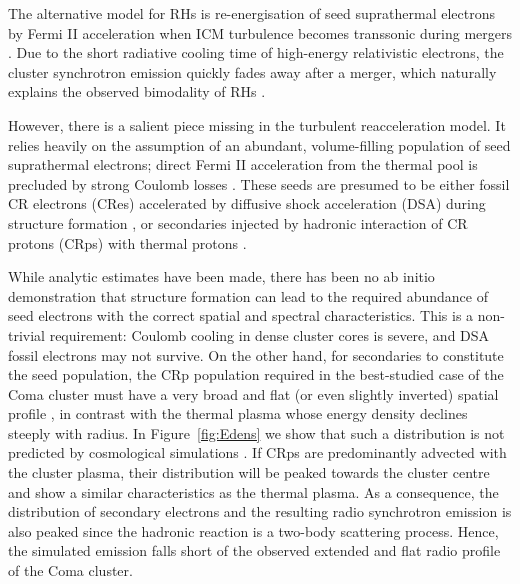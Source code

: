 \documentclass[fleqn,usenatbib,useAMS]{mnras}
\begin{document}
The alternative model for RHs is re-energisation of seed suprathermal
electrons by Fermi II acceleration when ICM turbulence becomes
transsonic during mergers
\citep{1987A&A...182...21S,1993ApJ...406..399G,2001MNRAS.320..365B,
  2004MNRAS.350.1174B,brunetti07,brunetti11,miniati15}. Due
to the short radiative cooling time of high-energy relativistic
electrons, the cluster synchrotron emission quickly fades away after a
merger, which naturally explains the observed bimodality of RHs
\cite[see e.g.][]{2013MNRAS.429.3564D,2014MNRAS.443.3564D}.

However, there is a salient piece missing in the turbulent
reacceleration model. It relies heavily on the assumption of an
abundant, volume-filling population of seed suprathermal electrons;
direct Fermi II acceleration from the thermal pool is precluded by
strong Coulomb losses
\citep{2008ApJ...682..175P,2012ApJ...759..113C}. These seeds are
presumed to be either fossil CR electrons (CRes) accelerated by
diffusive shock acceleration (DSA) during structure formation
\citep{1999ApJ...520..529S}, or secondaries injected by hadronic
interaction of CR protons (CRps) with thermal protons
\citep{brunetti11}.

While analytic estimates have been made, there has been no ab initio
demonstration that structure formation can lead to the required
abundance of seed electrons with the correct spatial and spectral
characteristics. This is a non-trivial requirement: Coulomb cooling in
dense cluster cores is severe, and DSA fossil electrons may not
survive. On the other hand, for secondaries to constitute the seed
population, the CRp population required in the best-studied case of
the Coma cluster must have a very broad and flat (or even slightly
inverted) spatial profile \citep{brunetti12}, in contrast with the
thermal plasma whose energy density declines steeply with radius. In
Figure~\ref{fig:Edens} we show that such a distribution is not predicted
by cosmological simulations \cite[see
  also][]{pinzke10,2014MNRAS.439.2662V}. If CRps are predominantly
advected with the cluster plasma, their distribution will be peaked
towards the cluster centre and show a similar characteristics as the
thermal plasma. As a consequence, the distribution of secondary
electrons and the resulting radio synchrotron emission is also peaked
since the hadronic reaction is a two-body scattering process. Hence,
the simulated emission falls short of the observed extended and flat
radio profile of the Coma cluster.
\end{document}
